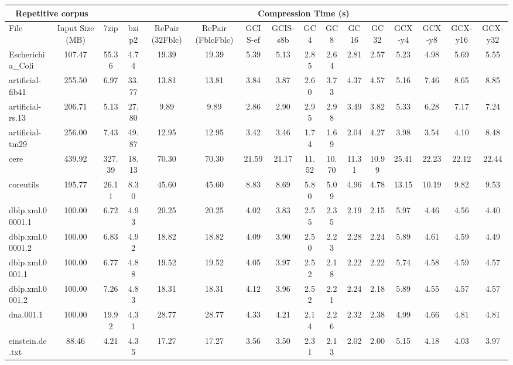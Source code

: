 \begin{table}[]
\centering
\begin{tabular}{|l|c|c|c|c|c|c|c|c|c|c|c|c|c|c|c|}
\hline
\multicolumn{2}{|c|}{Repetitive corpus} & \multicolumn{14}{c|}{Compression Time (s)} \\
\hline
File & Input Size (MB) & 7zip & bzip2 & RePair (32Fblc) & RePair (FblcFblc) & GCIS-ef & GCIS-s8b & GC4 & GC8 & GC16 & GC32 & GCX-y4 & GCX-y8 & GCX-y16 & GCX-y32 \\
\hline
Escherichia\_Coli & 107.47 & 55.36 & 4.74 & 19.39 & 19.39 & 5.39 & 5.13 & 2.85 & 2.64 & 2.81 & 2.57 & 5.23 & 4.98 & 5.69 & 5.55 \\
\hline
artificial-fib41 & 255.50 & 6.97 & 33.77 & 13.81 & 13.81 & 3.84 & 3.87 & 2.60 & 3.73 & 4.37 & 4.57 & 5.16 & 7.46 & 8.65 & 8.85 \\
\hline
artificial-rs.13 & 206.71 & 5.13 & 27.80 & 9.89 & 9.89 & 2.86 & 2.90 & 2.95 & 2.98 & 3.49 & 3.82 & 5.33 & 6.28 & 7.17 & 7.24 \\
\hline
artificial-tm29 & 256.00 & 7.43 & 49.87 & 12.95 & 12.95 & 3.42 & 3.46 & 1.74 & 1.69 & 2.04 & 4.27 & 3.98 & 3.54 & 4.10 & 8.48 \\
\hline
cere & 439.92 & 327.39 & 18.13 & 70.30 & 70.30 & 21.59 & 21.17 & 11.52 & 10.70 & 11.31 & 10.99 & 25.41 & 22.23 & 22.12 & 22.44 \\
\hline
coreutils & 195.77 & 26.11 & 8.30 & 45.60 & 45.60 & 8.83 & 8.69 & 5.80 & 5.09 & 4.96 & 4.78 & 13.15 & 10.19 & 9.82 & 9.53 \\
\hline
dblp.xml.00001.1 & 100.00 & 6.72 & 4.93 & 20.25 & 20.25 & 4.02 & 3.83 & 2.55 & 2.35 & 2.19 & 2.15 & 5.97 & 4.46 & 4.56 & 4.40 \\
\hline
dblp.xml.00001.2 & 100.00 & 6.83 & 4.92 & 18.82 & 18.82 & 4.09 & 3.90 & 2.50 & 2.23 & 2.28 & 2.24 & 5.89 & 4.61 & 4.59 & 4.49 \\
\hline
dblp.xml.0001.1 & 100.00 & 6.77 & 4.88 & 19.52 & 19.52 & 4.05 & 3.97 & 2.52 & 2.18 & 2.22 & 2.22 & 5.74 & 4.58 & 4.59 & 4.57 \\
\hline
dblp.xml.0001.2 & 100.00 & 7.26 & 4.83 & 18.31 & 18.31 & 4.12 & 3.96 & 2.52 & 2.21 & 2.24 & 2.18 & 5.89 & 4.55 & 4.57 & 4.57 \\
\hline
dna.001.1 & 100.00 & 19.92 & 4.31 & 28.77 & 28.77 & 4.33 & 4.21 & 2.14 & 2.26 & 2.32 & 2.38 & 4.99 & 4.66 & 4.81 & 4.81 \\
\hline
einstein.de.txt & 88.46 & 4.21 & 4.35 & 17.27 & 17.27 & 3.56 & 3.50 & 2.31 & 2.13 & 2.02 & 2.00 & 5.15 & 4.18 & 4.03 & 3.97 \\

\end{tabular}
\end{table}
